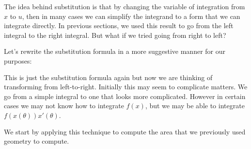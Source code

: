 \documentclass{ximera}
\begin{document}
The idea behind substitution is that by changing the variable of integration from $x$ to $u$, then in many cases we can 
simplify the integrand to a form that we can integrate directly. In previous sections, 
we used this result to go from the left integral to the right integral. But what if we tried going from right to left? 


Let's rewrite the substitution formula in a more suggestive manner for our purposes:



\begin{image}
\end{image}

This is just the substitution formula again but now we are thinking of transforming from left-to-right.  Initially this may seem to complicate matters. We go from a simple integral to one that looks more complicated. 
However in certain cases we may not know how to integrate $f(x)$, but we may be able to integrate 
$f(x(\theta)) x'(\theta)$. 


We start by applying this technique to compute the area that we previously used
geometry to compute.
\end{document}
